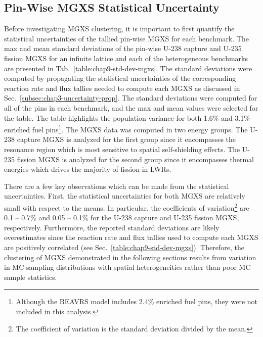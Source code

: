 \subsection{Pin-Wise MGXS Statistical Uncertainty}
\label{subsec:chap9-mgxs-uncertainty}

Before investigating \ac{MGXS} clustering, it is important to first quantify the statistical uncertainties of the tallied pin-wise \ac{MGXS} for each benchmark. The max and mean standard deviations of the pin-wise U-238 capture and U-235 fission \ac{MGXS} for an infinite lattice and each of the heterogeneous benchmarks are presented in Tab.~\ref{table:chap9-std-dev-mgxs}. The standard deviations were computed by propagating the statistical uncertainties of the corresponding reaction rate and flux tallies needed to compute each \ac{MGXS} as discussed in Sec.~\ref{subsec:chap3-uncertainty-prop}. The standard deviations were computed for all of the pins in each benchmark, and the max and mean values were selected for the table. The table highlights the population variance for both 1.6\% and 3.1\% enriched fuel pins\footnote{Although the \ac{BEAVRS} model includes 2.4\% enriched fuel pins, they were not included in this analysis.}. The \ac{MGXS} data was computed in two energy groups. The U-238 capture \ac{MGXS} is analyzed for the first group since it encompasses the resonance region which is most sensitive to spatial self-shielding effects. The U-235 fission \ac{MGXS} is analyzed for the second group since it encompasses thermal energies which drives the majority of fission in \acp{LWR}.

There are a few key observations which can be made from the statistical uncertainties. First, the statistical uncertainties for both \ac{MGXS} are relatively small with respect to the means. In particular, the coefficients of variation\footnote{The coefficient of variation is the standard deviation divided by the mean.} are 0.1 -- 0.7\% and 0.05 -- 0.1\% for the U-238 capture and U-235 fission \ac{MGXS}, respectively. Furthermore, the reported standard deviations are likely overestimates since the reaction rate and flux tallies used to compute each \ac{MGXS} are positively correlated (see Sec.~\ref{table:chap9-std-dev-mgxs}). Therefore, the clustering of \ac{MGXS} demonstrated in the following sections results from variation in \ac{MC} sampling distributions with spatial heterogeneities rather than poor \ac{MC} sample statistics.

